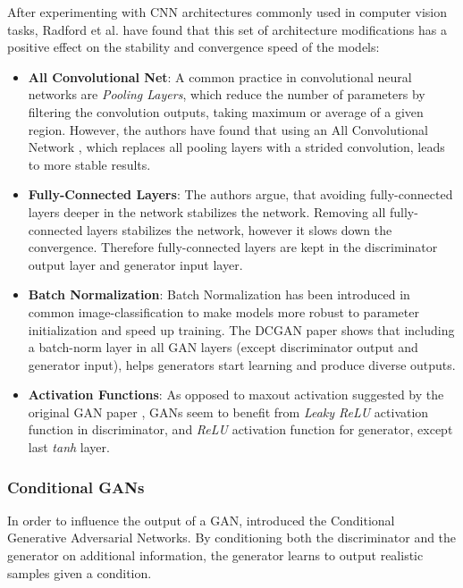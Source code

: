 \documentclass{article}
\begin{document}
After experimenting with CNN architectures commonly used in computer vision tasks, Radford et al. have found that this set of architecture modifications has a positive effect on the stability and convergence speed of the models:
\begin{itemize}
\item \textbf{All Convolutional Net}: A common practice in convolutional neural networks are \textit{Pooling Layers}, which reduce the number of parameters by filtering the convolution outputs, taking maximum or average of a given region. However, the authors have found that using an All Convolutional Network \cite{springenberg_striving_2014}, which replaces all pooling layers with a strided convolution, leads to more stable results.
\item \textbf{Fully-Connected Layers}: The authors argue, that avoiding fully-connected layers deeper in the network stabilizes the network. Removing all fully-connected layers stabilizes the network, however it slows down the convergence. Therefore fully-connected layers are kept in the discriminator output layer and generator input layer. 
\item \textbf{Batch Normalization}: Batch Normalization \cite{ioffe_batch_2015} has been introduced in common image-classification to make models more robust to parameter initialization and speed up training. The DCGAN paper shows that including a batch-norm layer in all GAN layers (except discriminator output and generator input), helps generators start learning and produce diverse outputs.
\item \textbf{Activation Functions}: As opposed to maxout activation suggested by the original GAN paper \cite{goodfellow_generative_2014}, GANs seem to benefit from \textit{Leaky ReLU} activation function in discriminator, and \textit{ReLU} activation function for generator, except last \textit{tanh} layer. 
\end{itemize}



\subsubsection{Conditional GANs}
In order to influence the output of a GAN, \cite{mirza_conditional_2014} introduced the Conditional Generative Adversarial Networks. By conditioning both the discriminator and the generator on additional information, the generator learns to output realistic samples given a condition. 
\end{document}
